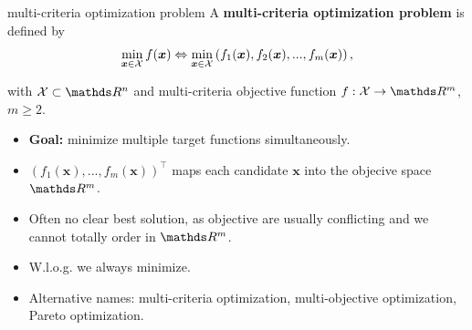 \documentclass[11pt,compress,t,notes=noshow, xcolor=table]{beamer}
\begin{document}
\begin{vbframe}{multi-criteria optimization problem}
A \textbf{multi-criteria optimization problem} is defined by\\

$$
\min_{\bm{x} \in \mathcal{X}} f(\bm{x}) \Leftrightarrow \min_{\bm{x} \in \mathcal{X}} \left(f_1(\bm{x}),  f_2(\bm{x}), ..., f_m(\bm{x})\right),
$$


with $\Xspace \subset \R ^ n$ and multi-criteria objective function $f: \Xspace \to \R ^ m$, $m \ge 2$.

\begin{itemize}
\item \textbf{Goal:} minimize multiple target functions simultaneously.
\item $\left(f_1(\bm{x}), ..., f_m(\bm{x})\right)^\top$ maps each candidate $\bm{x}$ into the objecive space $\R^m$.
\item Often no clear best solution, as objective are usually conflicting and we cannot totally order in $\R^m$. 
\item W.l.o.g. we always minimize.
\item Alternative names: multi-criteria optimization, multi-objective optimization, Pareto optimization.
\end{itemize}

\end{vbframe}


\endlecture
\end{document}
